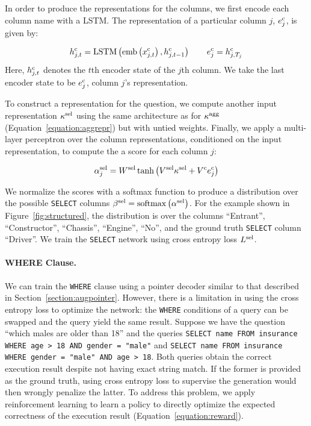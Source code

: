 \documentclass{article} %
\begin{document}
In order to produce the representations for the columns, we first encode each column name with a LSTM.
The representation of a particular column $j$, $e^{\rm c}_j$, is given by:

%
\begin{align}
h^{\rm c}_{j, t} = {\rm LSTM} \left(  {\rm emb} \left( x^{\rm c}_{j,t} \right)  ,  h^{\rm c}_{j, {t-1}}  \right)
\qquad
e^{\rm c}_j = h^{\rm c}_{j, T_j}
\end{align}
%
Here, $h^{\rm c}_{j, t}$ denotes the $t$th encoder state of the $j$th column.
We take the last encoder state to be $e^{\rm c}_j$, column $j$'s representation.

To construct a representation for the question, we compute another input representation $\kappa^{\rm sel}$ using the same architecture as for $\kappa^{\rm agg}$ (Equation~\ref{equation:aggrepr}) but with untied weights.
%
Finally, we apply a multi-layer perceptron over the column representations, conditioned on the input representation, to compute the a score for each column $j$:

\begin{equation}
\alpha^{\rm sel}_j = W^{\rm sel} \tanh \left( V^{\rm sel} \kappa^{\rm sel} + V^{\rm c} e^{\rm c}_j \right)
\end{equation}

We normalize the scores with a softmax function to produce a distribution over the possible \texttt{SELECT} columns $\beta^{\rm sel} = {\rm softmax} \left( \alpha^{\rm sel} \right)$.
For the example shown in Figure~\ref{fig:structured}, the distribution is over the columns ``Entrant'', ``Constructor'', ``Chassis'', ``Engine'', ``No'', and the ground truth \texttt{SELECT} column ``Driver''.
We train the \texttt{SELECT} network using cross entropy loss $L^{\rm sel}$.


\paragraph{WHERE Clause.}
\label{section:rl}
%
We can train the \texttt{WHERE} clause using a pointer decoder similar to that described in Section~\ref{section:augpointer}.
However, there is a limitation in using the cross entropy loss to optimize the network:
the \texttt{WHERE} conditions of a query can be swapped and the query yield the same result.
Suppose we have the question ``which males are older than 18'' and the queries 
\texttt{SELECT name FROM insurance WHERE age > 18 AND gender = "male"}
and
\texttt{SELECT name FROM insurance WHERE gender = "male" AND age > 18}.
Both queries obtain the correct execution result despite not having exact string match.
If the former is provided as the ground truth, using cross entropy loss to supervise the generation would then wrongly penalize the latter.
To address this problem, we apply reinforcement learning to learn a policy to directly optimize the expected correctness of the execution result (Equation~\ref{equation:reward}).
\end{document}
